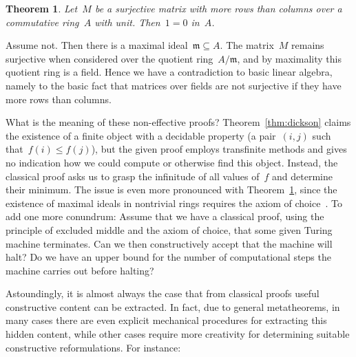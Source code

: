\documentclass[10pt,reqno,a4paper,openany]{amsbook}
\makeatletter
\theoremstyle{definition}
\theoremstyle{plain}
\newtheorem{thm}[defn]{Theorem}
\theoremstyle{remark}
\newcommand{\mmm}{\mathfrak{m}}
\newcommand{\?}{\,{:}\,}
\renewcommand{\_}{\mathpunct{.}\,}
\renewenvironment{proof}[1][\proofname]{\par
  \pushQED{\qed}%
  \normalfont \topsep6\p@\@plus6\p@\relax
  \trivlist
  \item[\hskip\labelsep
        \itshape
    #1\@addpunct{.}]\ignorespaces
}{%
  \popQED\endtrivlist\@endpefalse
}
\makeatother
\begin{document}
\begin{thm}\label{thm:surjective-matrix}
Let~$M$ be a surjective matrix with more rows than columns over a commutative
ring~$A$ with unit. Then~$1 = 0$ in~$A$.
\end{thm}

\begin{proof}[Proof (classical)]Assume not. Then there is a maximal
ideal~$\mmm \subseteq A$. The matrix~$M$ remains surjective when considered over
the quotient ring~$A/\mmm$, and by maximality this quotient ring is a field.
Hence we have a contradiction to basic linear algebra, namely to the basic fact
that matrices over fields are not surjective if they have more rows than
columns.\end{proof}

What is the meaning of these non-effective proofs? Theorem~\ref{thm:dickson}
claims the existence of a finite object with a decidable property (a
pair~$(i,j)$ such that~$f(i) \leq f(j)$), but the given proof employs
transfinite methods and gives no indication how we could compute or otherwise
find this object. Instead, the classical proof asks us to grasp the infinitude
of all values of~$f$ and determine their minimum. The issue is even more
pronounced with Theorem~\ref{thm:surjective-matrix}, since the existence of
maximal ideals in nontrivial rings requires the axiom of
choice~\cite{scott:prime-ideals,hodges:krull,banaschewski:krull,erne:krull,howard-rubin:ac}.
To add one more conundrum: Assume that we have a classical proof, using the principle
of excluded middle and the axiom of choice, that some given Turing machine
terminates. Can we then constructively accept that the machine will halt? Do we
have an upper bound for the number of computational steps the machine carries
out before halting?

Astoundingly, it is almost always the case that from classical proofs useful
constructive content can be extracted. In fact, due to general metatheorems,
in many cases there are even explicit mechanical procedures for extracting this
hidden content, while other cases require more creativity for determining
suitable constructive reformulations. For instance:
\end{document}
